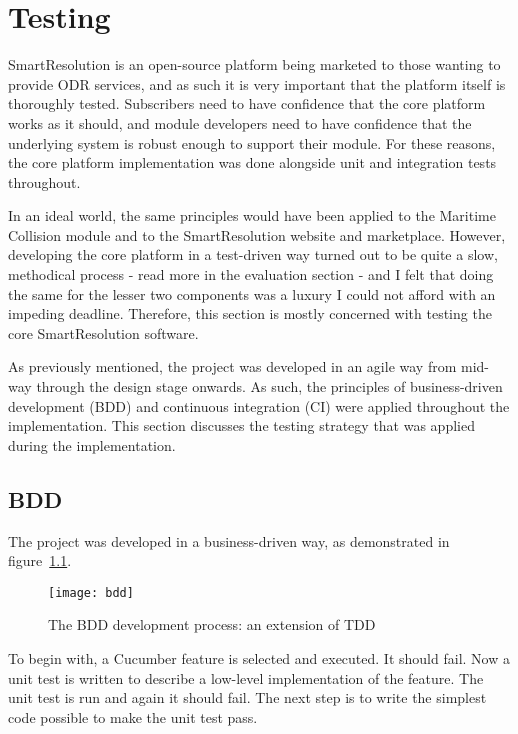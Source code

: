 \chapter{Testing}

SmartResolution is an open-source platform being marketed to those wanting to provide ODR services, and as such it is very important that the platform itself is thoroughly tested. Subscribers need to have confidence that the core platform works as it should, and module developers need to have confidence that the underlying system is robust enough to support their module. For these reasons, the core platform implementation was done alongside unit and integration tests throughout.

In an ideal world, the same principles would have been applied to the Maritime Collision module and to the SmartResolution website and marketplace. However, developing the core platform in a test-driven way turned out to be quite a slow, methodical process - read more in the evaluation section - and I felt that doing the same for the lesser two components was a luxury I could not afford with an impeding deadline. Therefore, this section is mostly concerned with testing the core SmartResolution software.

As previously mentioned, the project was developed in an agile way from mid-way through the design stage onwards. As such, the principles of business-driven development (BDD) and continuous integration (CI) were applied throughout the implementation. This section discusses the testing strategy that was applied during the implementation.

\section{BDD}

The project was developed in a business-driven way, as demonstrated in figure~\ref{uml:bdd}.

\begin{figure}[h!]
  \centering
    \ifimages
    \texttt{[image: bdd]}
    \fi
  \caption{The BDD development process: an extension of TDD}
  \label{uml:bdd}
\end{figure}

To begin with, a Cucumber feature is selected and executed. It should fail. Now a unit test is written to describe a low-level implementation of the feature. The unit test is run and again it should fail. The next step is to write the simplest code possible to make the unit test pass.

